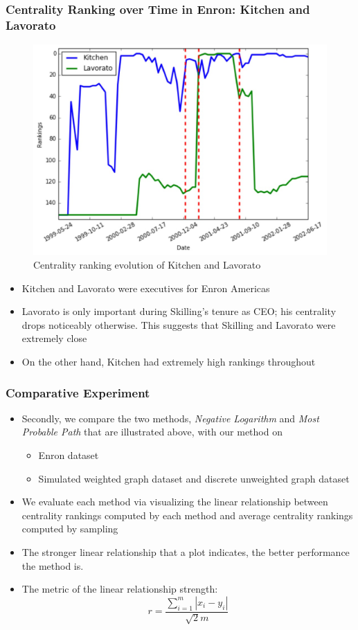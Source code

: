 \documentclass[9pt]{beamer}
\begin{document}
\begin{frame}
\frametitle{Centrality Ranking over Time in Enron: Kitchen and Lavorato}
\begin{figure}[H]
\centering
\includegraphics[scale = 0.3]{rank_change2.png}
\caption{Centrality ranking evolution of Kitchen and Lavorato}
\end{figure}
\vspace{-0.15in}
\begin{itemize}
\item Kitchen and Lavorato were executives for Enron Americas
\item Lavorato is only important during Skilling's tenure as CEO; his centrality drops noticeably otherwise. This suggests that Skilling and Lavorato were extremely close
\item On the other hand, Kitchen had extremely high rankings throughout
\end{itemize}
\end{frame}

\begin{frame}
\frametitle{Comparative Experiment}
\begin{itemize}
\item Secondly, we compare the two methods, \textit{Negative Logarithm} and \textit{Most Probable Path} that are illustrated above, with our method on 
\begin{itemize}
\item Enron dataset
\item Simulated weighted graph dataset and discrete unweighted graph dataset
\end{itemize}
\item We evaluate each method via visualizing the linear relationship between centrality rankings computed by each method and average centrality rankings computed by sampling
\item The stronger linear relationship that a plot indicates, the better performance the method is.
\item The metric of the linear relationship strength:
\[ r=\frac{\sum_{i=1}^{m}|x_i-y_i|}{\sqrt{2}m} \]
\end{itemize}
\end{frame}
\end{document}
